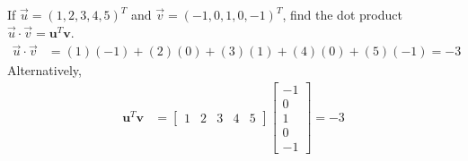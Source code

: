 \begin{exmp}
If $\vec{u} = (1, 2, 3, 4, 5)^T$ and $\vec{v} = (-1, 0, 1, 0, -1)^T$, find the dot product $\vec{u} \cdot \vec{v} = \textbf{u}^T\textbf{v}$.
\begin{align*}
\vec{u} \cdot \vec{v} &= (1)(-1) + (2)(0) + (3)(1) + (4)(0) + (5)(-1) = -3
\end{align*}
Alternatively,
\begin{align*}
\textbf{u}^T\textbf{v} &=
\begin{bmatrix}
1 & 2 & 3 & 4 & 5
\end{bmatrix}
\begin{bmatrix}
-1 \\
0 \\
1 \\
0 \\
-1
\end{bmatrix}
= -3
\end{align*}
\end{exmp}

